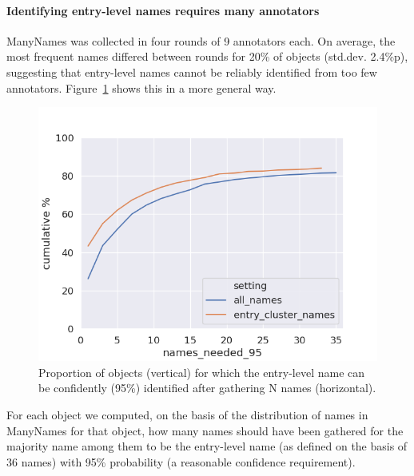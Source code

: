 

\paragraph{Identifying entry-level names requires many annotators}
ManyNames was collected in four rounds of 9 annotators each.
On average, the most frequent names differed between rounds for 20\% of objects (std.dev. 2.4\%p), suggesting that entry-level names cannot be reliably identified from too few annotators.
Figure~\ref{fig:entry-level-name-stability} shows this in a more general way.
\begin{figure}[t]
	\includegraphics[width=\columnwidth]{images/stability_analytic.png}
	\caption{Proportion of objects (vertical) for which the entry-level name can be confidently (95\%) identified after gathering N names (horizontal). }
	\label{fig:entry-level-name-stability}
\end{figure}
For each object we computed, on the basis of the distribution of names in ManyNames for that object, how many names should have been gathered for the majority name among them to be the entry-level name (as defined on the basis of 36 names) with 95\% probability (a reasonable confidence requirement).
